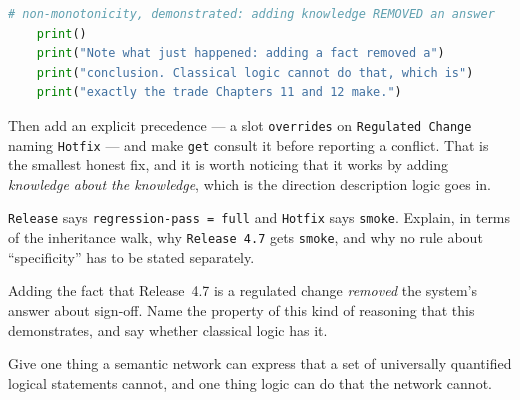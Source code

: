 \begin{lab}
\begin{lstlisting}[language=Python]
    # non-monotonicity, demonstrated: adding knowledge REMOVED an answer
    print()
    print("Note what just happened: adding a fact removed a")
    print("conclusion. Classical logic cannot do that, which is")
    print("exactly the trade Chapters 11 and 12 make.")
\end{lstlisting}
Then add an explicit precedence --- a slot \texttt{overrides} on
\texttt{Regulated Change} naming \texttt{Hotfix} --- and make \texttt{get} consult
it before reporting a conflict. That is the smallest honest fix, and it is worth
noticing that it works by adding \emph{knowledge about the knowledge}, which is the
direction description logic goes in.
\end{lab}

\begin{checkpoint}
\begin{tightnum}
  \item \texttt{Release} says \texttt{regression-pass = full} and \texttt{Hotfix}
        says \texttt{smoke}. Explain, in terms of the inheritance walk, why
        \texttt{Release 4.7} gets \texttt{smoke}, and why no rule about
        ``specificity'' has to be stated separately.
  \item Adding the fact that Release~4.7 is a regulated change \emph{removed} the
        system's answer about sign-off. Name the property of this kind of reasoning
        that this demonstrates, and say whether classical logic has it.
  \item Give one thing a semantic network can express that a set of universally
        quantified logical statements cannot, and one thing logic can do that the
        network cannot.
\end{tightnum}
\end{checkpoint}

